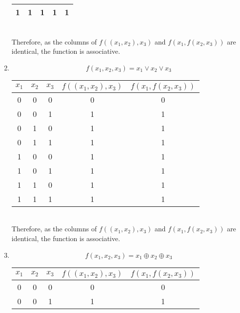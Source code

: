 \documentclass[fleqn, a4paper, 11pt, oneside]{amsart}
\theoremstyle{definition}
\theoremstyle{theorem}
\theoremstyle{remark}
\newcommand{\OR}{\vee}
\newcommand{\XOR}{\oplus}
\begin{document}
\begin{solution}
\begin{enumerate}
\begin{tabular}{|c|c|c||c|c|}
				1      & 1     & 1     & 1                  & 1                   \\
				\hline
			\end{tabular} \\
			Therefore, as the columns of $f((x_1,x_2),x_3)$ and $f(x_1,f(x_2,x_3))$ are identical, the function is associative.\\
		\item
			\begin{equation*}
				f(x_1,x_2,x_3) = x_1 \OR x_2 \OR x_3
			\end{equation*}
			\begin{tabular}{|c|c|c||c|c|}
				\hline
				$x_1$  & $x_2$ & $x_3$ & $f((x_1,x_2),x_3)$ & $f(x_1,f(x_2,x_3))$ \\
				\hline
				0      & 0     & 0     & 0                  & 0                   \\
				0      & 0     & 1     & 1                  & 1                   \\
				0      & 1     & 0     & 1                  & 1                   \\
				0      & 1     & 1     & 1                  & 1                   \\
				1      & 0     & 0     & 1                  & 1                   \\
				1      & 0     & 1     & 1                  & 1                   \\
				1      & 1     & 0     & 1                  & 1                   \\
				1      & 1     & 1     & 1                  & 1                   \\
				\hline
			\end{tabular} \\
			Therefore, as the columns of $f((x_1,x_2),x_3)$ and $f(x_1,f(x_2,x_3))$ are identical, the function is associative.\\
		\item
			\begin{equation*}
				f(x_1,x_2,x_3) = x_1 \XOR x_2 \XOR x_3
			\end{equation*}
			\begin{tabular}{|c|c|c||c|c|}
				\hline
				$x_1$  & $x_2$ & $x_3$ & $f((x_1,x_2),x_3)$ & $f(x_1,f(x_2,x_3))$ \\
				\hline
				0      & 0     & 0     & 0                  & 0                   \\
				0      & 0     & 1     & 1                  & 1                   \\

\end{tabular}
\end{enumerate}
\end{solution}
\end{document}
